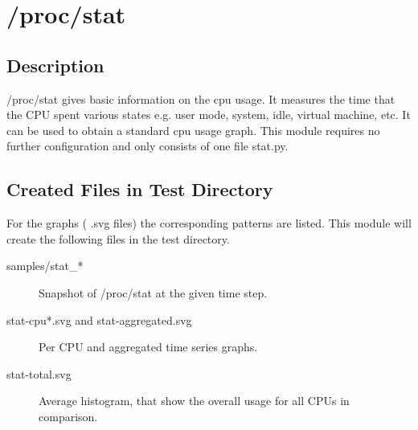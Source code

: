 \section{/proc/stat}

\subsection{Description}
    /proc/stat gives basic information on the cpu usage. It measures the time
    that the CPU spent various states e.g. user mode, system, idle, virtual machine, etc.
    It can be used to obtain a standard cpu usage graph.
    This module requires no further configuration and only consists of one file stat.py.



\subsection{Created Files in Test Directory}
    For the graphs ( .svg files) the corresponding patterns are listed.
    This module will create the following files in the test directory.
    \begin{description}
        \item[samples/stat\_*]
            Snapshot of /proc/stat at the given time step.

        \item[stat-cpu*.svg and stat-aggregated.svg]
            Per CPU and aggregated time series graphs.

        \item[stat-total.svg]
            Average histogram, that show the overall usage for all CPUs in comparison.

    \end{description}

